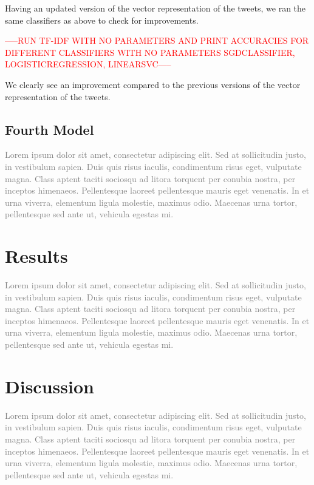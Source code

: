 \documentclass[10pt,conference,compsocconf]{IEEEtran}
\begin{document}
Having an updated version of the vector representation of the tweets, we ran the same classifiers as above to check for improvements.

\begin{center}\textcolor{red}{-----RUN TF-IDF WITH NO PARAMETERS AND PRINT ACCURACIES FOR DIFFERENT CLASSIFIERS WITH NO PARAMETERS
SGDCLASSIFIER, LOGISTICREGRESSION, LINEARSVC-----}\end{center}

We clearly see an improvement compared to the previous versions of the vector representation of the tweets.

\subsection{Fourth Model}
\textcolor{gray}{Lorem ipsum dolor sit amet, consectetur adipiscing elit. Sed at sollicitudin justo, in vestibulum sapien. Duis quis risus iaculis, condimentum risus eget, vulputate magna. Class aptent taciti sociosqu ad litora torquent per conubia nostra, per inceptos himenaeos. Pellentesque laoreet pellentesque mauris eget venenatis. In et urna viverra, elementum ligula molestie, maximus odio. Maecenas urna tortor, pellentesque sed ante ut, vehicula egestas mi.}

\section{Results}
\textcolor{gray}{Lorem ipsum dolor sit amet, consectetur adipiscing elit. Sed at sollicitudin justo, in vestibulum sapien. Duis quis risus iaculis, condimentum risus eget, vulputate magna. Class aptent taciti sociosqu ad litora torquent per conubia nostra, per inceptos himenaeos. Pellentesque laoreet pellentesque mauris eget venenatis. In et urna viverra, elementum ligula molestie, maximus odio. Maecenas urna tortor, pellentesque sed ante ut, vehicula egestas mi.}

\section{Discussion}

\textcolor{gray}{Lorem ipsum dolor sit amet, consectetur adipiscing elit. Sed at sollicitudin justo, in vestibulum sapien. Duis quis risus iaculis, condimentum risus eget, vulputate magna. Class aptent taciti sociosqu ad litora torquent per conubia nostra, per inceptos himenaeos. Pellentesque laoreet pellentesque mauris eget venenatis. In et urna viverra, elementum ligula molestie, maximus odio. Maecenas urna tortor, pellentesque sed ante ut, vehicula egestas mi.}
\end{document}
